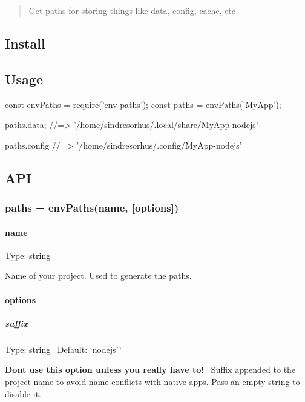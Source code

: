 \begin{quote}
Get paths for storing things like data, config, cache, etc \end{quote}


\subsection*{Install}




\subsection*{Usage}


\begin{DoxyCode}
const envPaths = require('env-paths');
const paths = envPaths('MyApp');

paths.data;
//=> '/home/sindresorhus/.local/share/MyApp-nodejs'

paths.config
//=> '/home/sindresorhus/.config/MyApp-nodejs'
\end{DoxyCode}


\subsection*{A\+PI}

\subsubsection*{paths = env\+Paths(name, \mbox{[}options\mbox{]})}

\paragraph*{name}

Type\+: {\ttfamily string}

Name of your project. Used to generate the paths.

\paragraph*{options}

\subparagraph*{suffix}

Type\+: {\ttfamily string}~\newline
 Default\+: `\textquotesingle{}nodejs'\`{}

{\bfseries Don\textquotesingle{}t use this option unless you really have to!}~\newline
 Suffix appended to the project name to avoid name conflicts with native apps. Pass an empty string to disable it.


